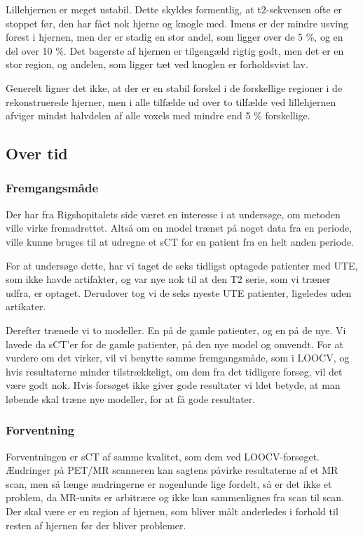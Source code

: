 Lillehjernen er meget ustabil. Dette skyldes formentlig, at t2-sekvensen
ofte er stoppet før, den har fået nok hjerne og knogle med. Imens er der
mindre usving forest i hjernen, men der er stadig en stor andel, som
ligger over de 5 \%, og en del over 10 \%. Det bagerste af hjernen er
tilgengæld rigtig godt, men det er en stor region, og andelen, som ligger
tæt ved knoglen er forholdsvist lav.

Generelt ligner det ikke, at der er en stabil forskel i de forskellige
regioner i de rekonstruerede hjerner, men i alle tilfælde ud over to
tilfælde ved lillehjernen afviger mindst halvdelen af alle voxels med
mindre end 5 \% forskellige.


\subsection{Over tid}
\subsubsection{Fremgangsmåde}

Der har fra Rigshopitalets side været en interesse i at undersøge, om
metoden ville virke fremadrettet. Altså om en model trænet på noget data
fra en periode, ville kunne bruges til at udregne et sCT for en patient
fra en helt anden periode. 

For at undersøge dette, har vi taget de seks
tidligst optagede patienter med UTE, som ikke havde artifakter, og
var nye nok til at den T2 serie, som vi træner udfra, er optaget.
Derudover tog vi de seks nyeste UTE patienter, ligeledes uden artikater.


Derefter trænede vi to modeller. En på de gamle patienter, og en på de
nye. Vi lavede da sCT'er for de gamle patienter, på den nye model og
omvendt. For at vurdere om det virker, vil vi benytte samme fremgangsmåde,
som i LOOCV, og hvis resultaterne minder tilstrækkeligt, om dem fra det
tidligere forsøg, vil det være godt nok. Hvis forsøget ikke giver gode
resultater vi ldet betyde, at man løbende skal træne nye modeller, for at
få gode resultater.

\subsubsection{Forventning}

Forventningen er sCT af samme kvalitet, som dem ved LOOCV-forsøget.
Ændringer på PET/MR scanneren kan sagtens påvirke resultaterne af et MR
scan, men så længe ændringerne er nogenlunde lige fordelt, så er det ikke
et problem, da MR-units er arbitrære og ikke kan sammenlignes fra scan til
scan. Der skal være er en region af hjernen, som bliver målt anderledes i
forhold til resten af hjernen før der bliver problemer.

